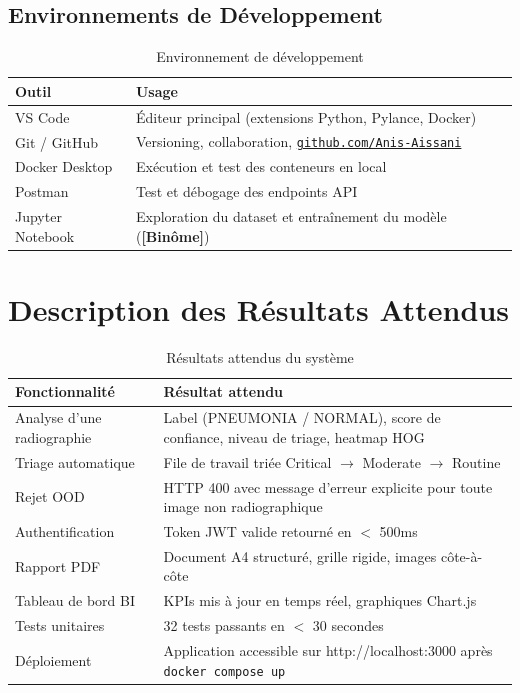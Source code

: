 \documentclass[12pt, a4paper]{report}
\newcommand{\binpart}{\textbf{[Binôme]}}
\begin{document}
\subsection{Environnements de Développement}

\begin{table}[H]
\centering
\caption{Environnement de développement}
\begin{tabularx}{\textwidth}{L{3.5cm} X}
\toprule
\textbf{Outil} & \textbf{Usage} \\
\midrule
VS Code           & Éditeur principal (extensions Python, Pylance, Docker) \\
Git / GitHub      & Versioning, collaboration, \href{https://github.com/Anis-Aissani}{\texttt{github.com/Anis-Aissani}} \\
Docker Desktop    & Exécution et test des conteneurs en local \\
Postman           & Test et débogage des endpoints API \\
Jupyter Notebook  & Exploration du dataset et entraînement du modèle (\binpart) \\
\bottomrule
\end{tabularx}
\end{table}

\section{Description des Résultats Attendus}

\begin{table}[H]
\centering
\caption{Résultats attendus du système}
\begin{tabularx}{\textwidth}{L{4cm} X}
\toprule
\textbf{Fonctionnalité} & \textbf{Résultat attendu} \\
\midrule
Analyse d'une radiographie & Label (PNEUMONIA / NORMAL), score de confiance, niveau de triage, heatmap HOG \\
Triage automatique & File de travail triée Critical $\rightarrow$ Moderate $\rightarrow$ Routine \\
Rejet OOD & HTTP 400 avec message d'erreur explicite pour toute image non radiographique \\
Authentification & Token JWT valide retourné en $<$ 500ms \\
Rapport PDF & Document A4 structuré, grille rigide, images côte-à-côte \\
Tableau de bord BI & KPIs mis à jour en temps réel, graphiques Chart.js \\
Tests unitaires & 32 tests passants en $<$ 30 secondes \\
Déploiement & Application accessible sur http://localhost:3000 après \texttt{docker compose up} \\
\bottomrule
\end{tabularx}
\end{table}
\end{document}
